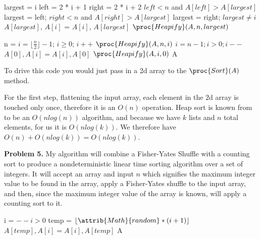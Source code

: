 \documentclass{article}
\begin{document}
\begin{codebox}
    \li largest = i
    \li left = 2 * i + 1
    \li right = 2 * i + 2
    \li
    \li \If $left < n$ and $A[left] > A[largest]$
    \li \Then largest = left; \End
    \li
    \li \If $right < n$ and $A[right] > A[largest]$
    \li \Then largest = right; \End
    \li
    \li \If $largest \neq i$
    \li \Then $A[largest]$, $A[i]$ = $A[i]$, $A[largest]$
    \li $\proc{Heapify}(A, n, largest)$ \End
\end{codebox}

\begin{codebox}
    \li n = 
    \li \For $i = \lfloor \frac{n}{2} \rfloor - 1$; $i \geq 0$; $i++$ \Do
    \li $\proc{Heapify}(A, n, i)$ \End
    \li
    \li \For $i = n - 1; i > 0; i--$ \Do
    \li $A[0], A[i] = A[i], A[0]$
    \li $\proc{Heapify}(A, i, 0)$ \End
    \li
    \li \Return A
\end{codebox}

\begin{codebox}
    \li \Return {}
\end{codebox}

To drive this code you would just pass in a 2d array to the $\proc{Sort}(A)$ method.

\hfill

For the first step, flattening the input array, each element in the 2d array is touched only once, therefore it is an $O(n)$ operation. Heap sort is known from \cite{CLRS} to be an $O(nlog(n))$ algorithm, and because we have $k$ lists and $n$ total elements, for us it is $O(nlog(k))$. We therefore have $O(n) + O(nlog(k)) = O(nlog(k))$.

\hfill

\textbf{Problem 5.} My algorithm will combine a Fisher-Yates Shuffle \cite{website:5} with a counting sort \cite{website:6} to produce a nondeterministic linear time sorting algorithm over a set of integers. It will accept an array and input $n$ which signifies the maximum integer value to be found in the array, apply a Fisher-Yates shuffle to the input array, and then, since the maximum integer value of the array is known, will apply a counting sort to it. 

\begin{codebox}
    \li i = 
    \li
    \li \While $--i > 0$ \Do
    \li temp = $\lfloor \attrib{Math}{random} * (i + 1) \rfloor$
    \li $A[temp], A[i] = A[i], A[temp]$ \End
    \li
    \li \Return A
\end{codebox}
\end{document}

